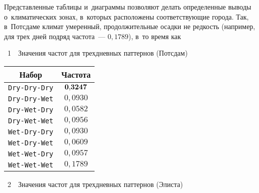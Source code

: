 \begin{multicols}{2}
Представленные таблицы и~диаграммы позволяют делать определенные выводы
о~климатических зонах, в~которых расположены соответствующие города. Так, 
в~Потсдаме климат умеренный, продолжительные осадки не редкость (например,
для  трех  дней подряд частота~--- $0{,}1789$), в~то время как\linebreak\vspace*{-12pt}

{
\begin{center}
\vspace*{3pt}
\begin{minipage}[t]{38mm}
{{\tablename~1}\ \ \small{Значения час\-тот для трехдневных паттернов (Потсдам)}}

\vspace*{2ex}

\tabcolsep=5.5pt
{\small \begin{tabular}{|c|c|}
\hline
{Набор}&{Частота}\\
\hline
\verb"Dry-Dry-Dry"&$\bf 0{,}3247$\\
\verb"Dry-Dry-Wet"&$0{,}0930$\\
\verb"Dry-Wet-Dry"&$0{,}0582$\\
\verb"Dry-Wet-Wet"&$0{,}0956$\\
\verb"Wet-Dry-Dry"&$0{,}0930$\\
\verb"Wet-Dry-Wet"&$0{,}0609$\\
\verb"Wet-Wet-Dry"&$0{,}0957$\\
\verb"Wet-Wet-Wet"&$0{,}1789$\\
\hline
\end{tabular}
}
\end{minipage}
\hfill
\begin{minipage}[t]{38mm}
{{\tablename~2}\ \ \small{Значения час\-тот для трехдневных паттернов (Элиста)}}

\vspace*{2ex}


\end{minipage}
\end{center}}
\end{multicols}
